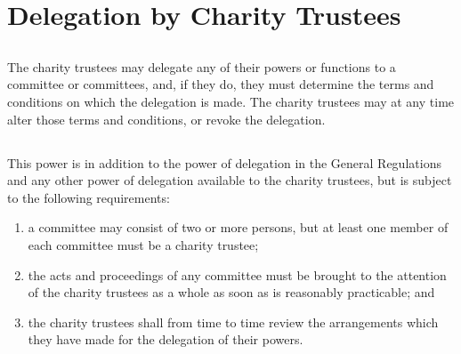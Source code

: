 \section{Delegation by Charity Trustees}\label{sec:delegation}

    \subsection{}
    The charity trustees may delegate any of their powers or functions to a committee or committees, and, if they do, they must determine the terms and conditions on which the delegation is made. The charity trustees may at any time alter those terms and conditions, or revoke the delegation.

    \subsection{}
    This power is in addition to the power of delegation in the General Regulations and any other power of delegation available to the charity trustees, but is subject to the following requirements:
    \begin{enumerate}
        \item a committee may consist of two or more persons, but at least one member of each committee must be a charity trustee;
        \item the acts and proceedings of any committee must be brought to the attention of the charity trustees as a whole as soon as is reasonably practicable; and
        \item the charity trustees shall from time to time review the arrangements which they have made for the delegation of their powers.
    \end{enumerate}
